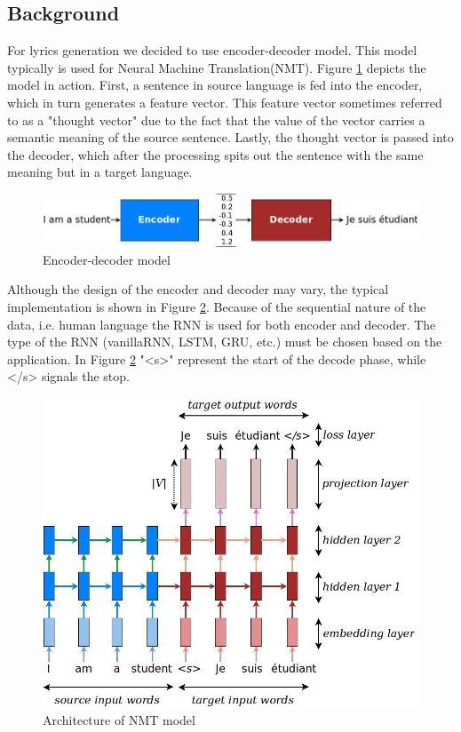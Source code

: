 \documentclass{article}
\begin{document}
\subsection{Background}
For lyrics generation we decided to use encoder-decoder model. This model typically is used for Neural Machine Translation(NMT). Figure \ref{fig:encdec-model} depicts the model in action. First, a sentence in source language is fed into the encoder, which in turn generates a feature vector. This feature vector sometimes referred to as a "thought vector" due to the fact that the value of the vector carries a semantic meaning of the source sentence. Lastly, the thought vector is passed into the decoder, which after the processing spits out the sentence with the same meaning but in a target language.\\
\begin{figure}[!ht]
\centering
\includegraphics[scale=0.4]{encdec.jpg}
\caption{Encoder-decoder model}
\label{fig:encdec-model}
\end{figure}

Although the design of the encoder and decoder may vary, the typical implementation is shown in Figure \ref{fig:nmt-arch}. Because of the sequential nature of the data, i.e. human language the RNN is used for both encoder and decoder. The type of the RNN (vanillaRNN, LSTM, GRU, etc.) must be chosen based on the application. In Figure \ref{fig:nmt-arch} "<s>" represent the start of the decode phase, while </s> signals the stop.
\\
\begin{figure}[!ht]
\centering
\includegraphics[scale=0.35]{nmt-architecture.jpg}
\caption{Architecture of NMT model}
\label{fig:nmt-arch}
\end{figure}
\end{document}
